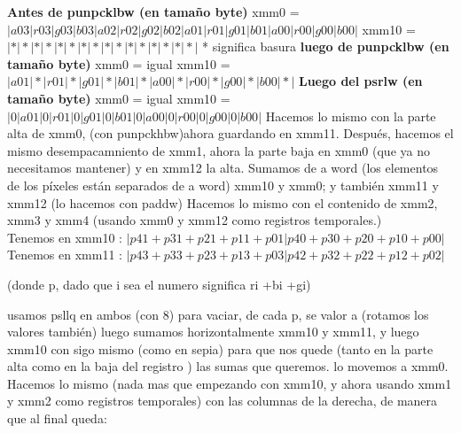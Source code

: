 \documentclass[a4paper]{article}
\begin{document}
        \textbf{ Antes de punpcklbw (en tamaño byte)}
                \hfill \break
        xmm0 = $|a03|r03|g03|b03|a02|r02|g02|b02|a01|r01|g01|b01|a00|r00|g00|b00|$
                \hfill \break
        xmm10 = $|*|*|*|*|*|*|*|*|*|*|*|*|*|*|*|*|$
        \hfill \break
        \small{* significa basura}
        \hfill \break
\textbf{        luego de punpcklbw (en tamaño byte)}
\hfill \break
        xmm0 = igual
        \hfill \break
        xmm10 = $|a01|*|r01|*|g01|*|b01|*|a00|*|r00|*|g00|*|b00|*|$
        \hfill \break
        \textbf{ Luego  del psrlw (en tamaño byte)}
        \hfill \break
         xmm0 = igual
         \hfill \break
         xmm10 = $|0|a01|0|r01|0|g01|0|b01|0|a00|0|r00|0|g00|0|b00|$
        \hfill \break
        Hacemos lo mismo con la parte alta de xmm0, (con punpckhbw)ahora guardando en xmm11.
        \hfill \break
        Después, hacemos el mismo desempacamniento de xmm1, ahora la parte baja en xmm0 (que ya no necesitamos mantener) y en xmm12 la alta.\hfill \break
        Sumamos de a word (los elementos de los píxeles están separados de a word) xmm10 y xmm0; y también xmm11 y xmm12 (lo hacemos con paddw)
        Hacemos lo mismo con el contenido de xmm2, xmm3 y xmm4 (usando xmm0 y xmm12 como registros temporales.) \hfill \break
        \\
        Tenemos en xmm10 : $ |p41+p31+p21+p11+p01|p40+p30+p20+p10+p00|$\hfill \break
        Tenemos en xmm11 : $ |p43+p33+p23+p13+p03|p42+p32+p22+p12+p02|$
        
        
        (donde p, dado que i sea el numero significa ri +bi +gi) \hfill \break
        
        usamos psllq en ambos (con 8) para vaciar, de cada p, se valor a (rotamos los valores también)
        luego sumamos horizontalmente xmm10 y xmm11, y luego xmm10 con sigo mismo (como en sepia) para que nos quede (tanto en la parte alta como en la baja del registro ) las sumas que queremos. lo movemos a xmm0. \hfill \break
        Hacemos lo mismo (nada mas que empezando con xmm10, y ahora usando xmm1 y xmm2 como registros temporales) con las columnas de la derecha, de manera que al final queda:\hfill \break
        
\end{document}
